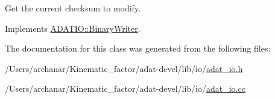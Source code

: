 Get the current checksum to modify. 



Implements \mbox{\hyperlink{classADATIO_1_1BinaryWriter_ae64230370824192d1f0dbcaa8e74017a}{A\+D\+A\+T\+I\+O\+::\+Binary\+Writer}}.



The documentation for this class was generated from the following files\+:\begin{DoxyCompactItemize}
\item 
/\+Users/archanar/\+Kinematic\+\_\+factor/adat-\/devel/lib/io/\mbox{\hyperlink{adat-devel_2lib_2io_2adat__io_8h}{adat\+\_\+io.\+h}}\item 
/\+Users/archanar/\+Kinematic\+\_\+factor/adat-\/devel/lib/io/\mbox{\hyperlink{adat-devel_2lib_2io_2adat__io_8cc}{adat\+\_\+io.\+cc}}\end{DoxyCompactItemize}
